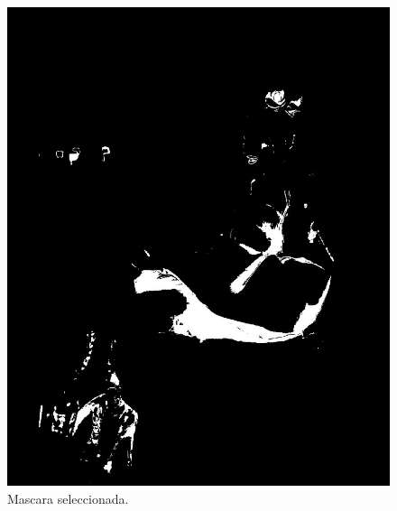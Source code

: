 \documentclass[11pt, letterpaper]{article}
\begin{document}
\begin{figure}[h!]
	\begin{minipage}{0.35\textwidth}
		\centering
		\includegraphics[width=\textwidth]{IMG/R12.jpg}
		\caption*{Mascara seleccionada.}
	\end{minipage}\hfill
	\begin{minipage}{0.35\textwidth}
		\centering

\end{minipage}
\end{figure}
\end{document}
